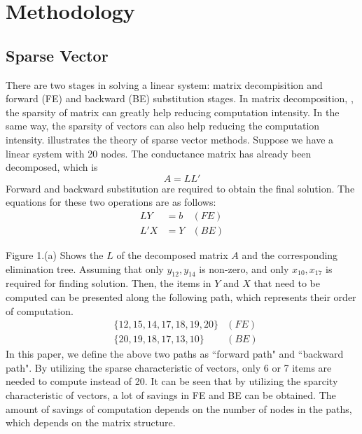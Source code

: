 \section{Methodology}
  \subsection{Sparse Vector}
    There are two stages in solving a linear system: matrix decompisition and forward (FE) and backward (BE) substitution stages. In matrix 
decomposition,
, the sparsity of matrix can greatly help reducing computation intensity. In the same way, the sparsity of vectors can also help reducing
the computation intensity. \cite{Tinney} illustrates the theory of sparse vector methods. Suppose we have a linear system with 20 nodes.
The conductance matrix has already been decomposed, which is 
\begin{equation}
	A=LL'\label{eq3.1}
\end{equation}
Forward and backward substitution are required to obtain the final solution. The equations for these two operations are as follows:
\begin{align}
	LY &=b  &(FE)\label{eq3.2}\\
	L'X &= Y&(BE)\label{eq3.3}
\end{align}

Figure 1.(a) Shows the $L$ of the decomposed matrix $A$ and the corresponding elimination tree. Assuming that only $y_{12}, y_{14}$ is 
non-zero, and only $x_{10},x_{17}$ is required for finding solution. Then, the items in $Y$ and $X$ that need to be computed can be 
presented along the following path, which represents their order of computation.
\begin{align}
&\{12, 15, 14, 17, 18, 19, 20\} &(FE)\label{eq3.4}\\
&\{20, 19, 18, 17, 13, 10\}&(BE)\label{eq3.5}
\end{align}
In this paper, we define the above two paths as ``forward path" and ``backward path". By utilizing the sparse characteristic of vectors,
only 6 or 7 items are needed to compute instead of 20. It can be seen that by utilizing the sparcity characteristic of vectors, a lot of
savings in FE and BE can be obtained. The amount of savings of computation depends on the number of nodes in the paths, which depends on 
the matrix structure. 
 
